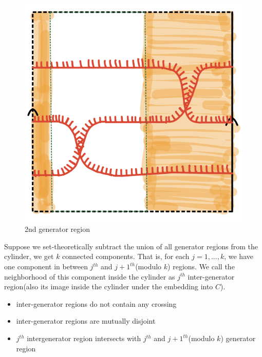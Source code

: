 \begin{figure}[H] %
    \centering
    \includegraphics[scale = 0.95]{diagrams/natural_alternating_diagrams/6-2.png} %
    \caption{2nd generator region}
    \label{fig:your-label}
\end{figure}


Suppose we set-theoretically subtract the union of all generator regions from the cylinder, we get $k$ connected components. That is, for each $j = 1,...,k$, we have one component in between $j^{th}$ and $j+1^{th}$(modulo $k$) regions. We call the neighborhood of this component inside the cylinder as  $j^{th}$ inter-generator region(also its image inside the cylinder under the embedding into $C$).
\begin{itemize}
\item inter-generator regions do not contain any crossing
\item inter-generator regions are mutually disjoint
\item $j^{th}$ intergenerator region intersects with $j^{th}$ and $j+1^{th}$(modulo $k$) generator region
\end{itemize}

